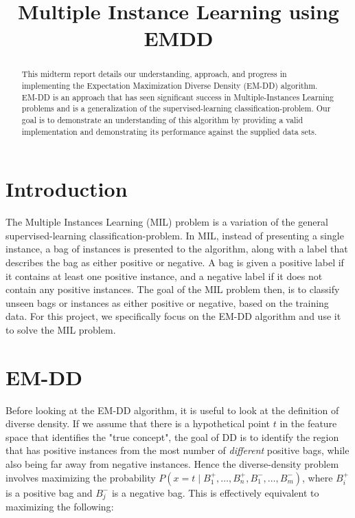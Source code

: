 \documentclass[conference]{IEEEtran}
\begin{document}
\title{Multiple Instance Learning using EMDD}

\author{
\and
{}
}

\maketitle

\begin{abstract}
This midterm report details our understanding, approach, and progress in implementing the Expectation Maximization Diverse Density (EM-DD)\cite{zhang2001dd} algorithm. EM-DD is an approach that has seen significant success in Multiple-Instances Learning problems and is a generalization of the supervised-learning classification-problem. Our goal is to demonstrate an understanding of this algorithm by providing a valid implementation and demonstrating its performance against the supplied data sets.
\end{abstract}


\IEEEpeerreviewmaketitle


\section{Introduction}
The Multiple Instances Learning (MIL) problem\cite{dietterich1997solving} is a variation of the general supervised-learning classification-problem. In MIL, instead of presenting a single instance, a bag of instances is presented to the algorithm, along with a label that describes the bag as either positive or negative. A bag is given a positive label if it contains at least one positive instance, and a negative label if it does not contain any positive instances. The goal of the MIL problem then, is to classify unseen bags or instances as either positive or negative, based on the training data. For this project, we specifically focus on the EM-DD algorithm and use it to solve the MIL problem. 

\section{EM-DD}

Before looking at the EM-DD algorithm, it is useful to look at the definition of diverse density. If we assume that there is a hypothetical point $t$ in the feature space that identifies the "true concept", the goal of DD is to identify the region that has positive instances from the most number of \textit{different} positive bags, while also being far away from negative instances. Hence the diverse-density problem involves maximizing the probability $P(x = t \mid B_1^+, \dots, B_n^+, B_1^-, \dots, B_m^-)$, where $B_i^+$ is a positive bag and $B_j^-$ is a negative bag. This is effectively equivalent to maximizing the following\cite{maron1998framework}:
\end{document}
